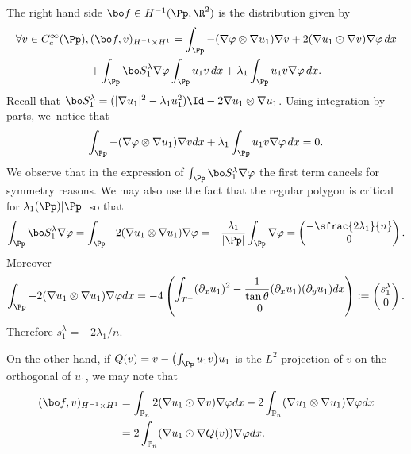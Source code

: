 The right hand side $\bo f \in H^{-1} (\Pp, \R^2)$ is the distribution given by
\vspace*{-5pt}
\begin{multline*}
\forall v \in C_c^\infty (\Pp), (\bo f,v)_{H^{-1}\times H^1} = \int_{\Pp} -(\nabla \varphi\otimes \nabla u_1)\nabla v+2(\nabla u_1 \odot \nabla v)\nabla \varphi \, dx\\
+\int_{\Pp} \bo S_1^\lambda \nabla \varphi \int_{\Pp} u_1v\, dx + \lambda_1\int_{\Pp} u_1v \nabla \varphi\, dx.
\end{multline*}
Recall that $\bo S_1^\lambda = (|\nabla u_1|^2 -\lambda_1 u_1^2)\Id -2\nabla u_1 \otimes \nabla u_1$. Using integration by parts, we~notice that
\[
\int_{\Pp} -(\nabla \varphi\otimes \nabla u_1)\nabla vdx+ \lambda_1 \int_{\Pp} u_1v \nabla \varphi\, dx=0.
\]
We observe that
in the expression of $\int_{\Pp} \bo S_1^\lambda \nabla \varphi $ the first term cancels for symmetry reasons. We may also use the fact that the regular polygon is critical for $\lambda_1(\Pp)|\Pp|$ so that
\[
\int_{\Pp} \bo S_1^\lambda \nabla \varphi = \int_{\Pp} -2(\nabla u_1 \otimes \nabla u_1) \nabla \varphi = -\frac{\lambda_1}{|\Pp|} \int_{\Pp} \nabla \varphi = \begin{pmatrix}
-\sfrac{2\lambda_1}{n} \\ 0
\end{pmatrix}.
\]
Moreover
\[
\int_{\Pp}-2 (\nabla u_1 \otimes \nabla u_1) \nabla \varphi dx = -4\begin{pmatrix} \displaystyle \int_{T^+ } (\partial_x u_1)^2 - \frac{1}{\tan \theta} (\partial_x u_1)(\partial_y u_1)dx\\0 \end{pmatrix}:= \begin{pmatrix} s_1^\lambda \\ 0\end{pmatrix}.
\]
Therefore $s_1^\lambda = -2\lambda_1/n$.

On the other hand, if $Q(v) = v-\bigl(\int_{\Pp} u_1v \bigr)u_1$ is the $L^2$-projection of $v$ on the orthogonal of $u_1$, we may note that
\begin{align}\label{eq:f-with-Q}
(\bo f,v)_{H^{-1}\times H^1} & = \int_{\Bbb P_n}2(\nabla u_1\odot \nabla v)\nabla \varphi dx - 2 \int_{\Bbb P_n} (\nabla u_1\otimes \nabla u_1)\nabla \varphi dx \\
& = 2\int_{\Bbb P_n} (\nabla u_1 \odot \nabla Q(v))\nabla \varphi dx. \notag
\end{align}

